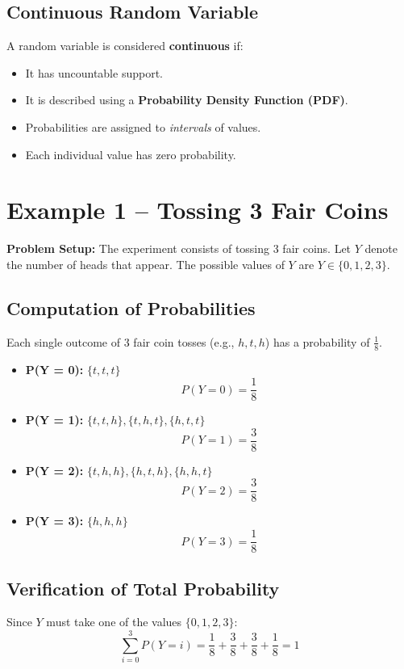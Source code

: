 \documentclass[11pt]{article}
\begin{document}
\subsection{Continuous Random Variable}
A random variable is considered \textbf{continuous} if:
\begin{itemize}
    \item It has uncountable support.
    \item It is described using a \textbf{Probability Density Function (PDF)}.
    \item Probabilities are assigned to \textit{intervals} of values.
    \item Each individual value has zero probability.
\end{itemize}

\section{Example 1 – Tossing 3 Fair Coins}
\textbf{Problem Setup:} The experiment consists of tossing 3 fair coins. Let $Y$ denote the number of heads that appear.
The possible values of $Y$ are $Y \in \{0, 1, 2, 3\}$.

\subsection*{Computation of Probabilities}
Each single outcome of 3 fair coin tosses (e.g., $h,t,h$) has a probability of $\frac{1}{8}$.

\begin{itemize}
    \item \textbf{P(Y = 0):} $\{t,t,t\}$
    \[ P(Y = 0) = \frac{1}{8} \]
    
    \item \textbf{P(Y = 1):} $\{t,t,h\}, \{t,h,t\}, \{h,t,t\}$
    \[ P(Y = 1) = \frac{3}{8} \]
    
    \item \textbf{P(Y = 2):} $\{t,h,h\}, \{h,t,h\}, \{h,h,t\}$
    \[ P(Y = 2) = \frac{3}{8} \]
    
    \item \textbf{P(Y = 3):} $\{h,h,h\}$
    \[ P(Y = 3) = \frac{1}{8} \]
\end{itemize}

\subsection*{Verification of Total Probability}
Since $Y$ must take one of the values $\{0,1,2,3\}$:
\[ \sum_{i=0}^{3} P(Y=i) = \frac{1}{8} + \frac{3}{8} + \frac{3}{8} + \frac{1}{8} = 1 \]
\end{document}
